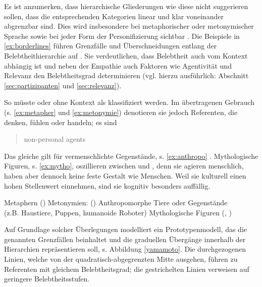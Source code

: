Es ist anzumerken, dass hierarchische Gliederungen wie diese nicht suggerieren sollen, dass die entsprechenden Kategorien linear und klar voneinander abgrenzbar sind. Dies wird  insbesondere bei metaphorischer oder metonymischer Sprache sowie bei jeder Form der Personifizierung sichtbar \parencite[vgl.][62]{Dahl1996}. Die Beispiele in \ref{ex:borderlines} führen Grenzfälle und Überschneidungen entlang der Belebtheithierarchie auf \parencites()()[basierend auf][62f.]{Dahl1996}[18ff]{Yamamoto1999}. Sie verdeutlichen, dass Belebtheit auch vom Kontext abhängig ist und neben der Empathie auch Faktoren wie Agentivität und Relevanz den Belebtheitsgrad determinieren (vgl. hierzu ausführlich: Abschnitt \ref{sec:partizipanten} und \ref{sec:relevanz}).

So müsste  oder  ohne Kontext als  klassifiziert werden. Im übertragenen Gebrauch (s. \ref{ex:metapher} und \ref{ex:metonymie}) denotieren sie jedoch Referenten, die denken, fühlen oder handeln; es sind \blockcquote[62]{Dahl1996}{non-personal agents}. Das gleiche gilt für vermenschlichte Gegenstände, s. \ref{ex:anthropo} \parencite[vgl. auch][]{Epley2007}. Mythologische Figuren, s. \ref{ex:mytho}, oszillieren zwischen  und , denn sie agieren menschlich, haben aber dennoch keine feste Gestalt wie Menschen. Weil sie kulturell einen hohen Stellenwert einnehmen, sind sie kognitiv besonders auffällig. 
  
\begin{exe}
	\ex \label{ex:borderlines}
	\begin{xlist}
		\ex \label{ex:metapher} Metaphern ()
 		\ex \label{ex:metonymie} Metonymien: ()
		\ex \label{ex:anthropo} Anthropomorphe Tiere oder Gegenstände \\(z.B. Haustiere, Puppen, humanoide Roboter)	
		\ex \label{ex:mytho} Mythologische Figuren (, )
	\end{xlist}
\end{exe}
\noindent
Auf Grundlage solcher Überlegungen modelliert \textcite{Yamamoto1999} ein Prototypenmodell, das die genannten Grenzfällen beinhaltet und die graduellen Übergänge innerhalb der Hierarchien repräsentieren soll, s. Abbildung \ref{yamamoto}. Die durchgezogenen Linien, welche von der quadratisch-abgegrenzten Mitte ausgehen, führen zu Referenten mit gleichem Belebtheitsgrad; die gestrichelten Linien verweisen auf geringere Belebtheitsstufen.

